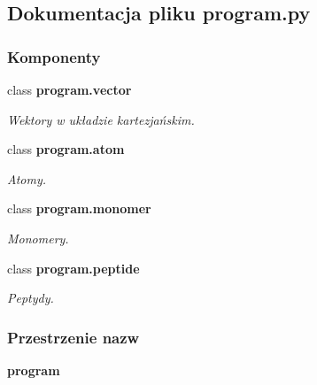 \subsection{Dokumentacja pliku program.\+py}
\label{program_8py}
\subsubsection*{Komponenty}
\begin{DoxyCompactItemize}
\item 
class \textbf{ program.\+vector}
\begin{DoxyCompactList}\small\item\em Wektory w układzie kartezjańskim. \end{DoxyCompactList}\item 
class \textbf{ program.\+atom}
\begin{DoxyCompactList}\small\item\em Atomy. \end{DoxyCompactList}\item 
class \textbf{ program.\+monomer}
\begin{DoxyCompactList}\small\item\em Monomery. \end{DoxyCompactList}\item 
class \textbf{ program.\+peptide}
\begin{DoxyCompactList}\small\item\em Peptydy. \end{DoxyCompactList}\end{DoxyCompactItemize}
\subsubsection*{Przestrzenie nazw}
\begin{DoxyCompactItemize}
\item 
 \textbf{ program}
\end{DoxyCompactItemize}
